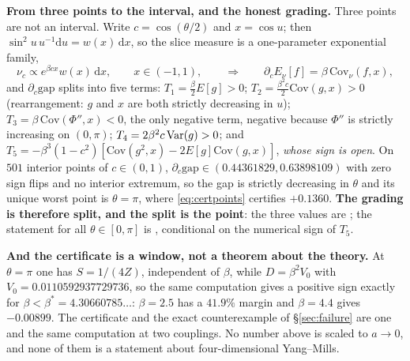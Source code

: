 \noindent
\textbf{From three points to the interval, and the honest grading.} Three points are not an interval.
Write $c=\cos(\theta/2)$ and $x=\cos u$; then $\sin^{2}u\,u^{-1}\mathrm{d}u=w(x)\,\mathrm{d}x$, so the
slice measure is a one-parameter exponential family,
\begin{equation}
\nu_{c}\propto e^{\beta cx}w(x)\,\mathrm{d}x,\qquad x\in(-1,1),
\qquad\Longrightarrow\qquad
\partial_{c}E_{\nu}[f]=\beta\,\mathrm{Cov}_{\nu}(f,x),
\label{eq:expfam}
\end{equation}
and $\partial_{c}\mathrm{gap}$ splits into five terms: $T_{1}=\tfrac{\beta}{2}E[g]>0$;
$T_{2}=\tfrac{\beta^{2}c}{2}\mathrm{Cov}(g,x)>0$ (rearrangement: $g$ and $x$ are both strictly
decreasing in $u$); $T_{3}=\beta\,\mathrm{Cov}(\Phi'',x)<0$, the only negative term, negative because
$\Phi''$ is strictly increasing on $(0,\pi)$; $T_{4}=2\beta^{2}c\operatorname{Var}(g)>0$; and
$T_{5}=-\beta^{3}(1-c^{2})[\mathrm{Cov}(g^{2},x)-2E[g]\mathrm{Cov}(g,x)]$, \emph{whose sign is open}.
On $501$ interior points of $c\in(0,1)$, $\partial_{c}\mathrm{gap}\in(0.44361829,0.63898109)$ with zero
sign flips and no interior extremum, so the gap is strictly decreasing in $\theta$ and its unique worst
point is $\theta=\pi$, where \eqref{eq:certpoints} certifies $+0.1360$. \textbf{The grading is therefore
split, and the split is the point}: the three values are \LT; the statement for all
$\theta\in[0,\pi]$ is \LC, conditional on the numerical sign of $T_{5}$. \LC
{}

\noindent
\textbf{And the certificate is a window, not a theorem about the theory.} At $\theta=\pi$ one has
$S=1/(4Z)$, independent of $\beta$, while $D=\beta^{2}V_{0}$ with $V_{0}=0.0110592937729736$, so the
same computation gives a positive sign exactly for $\beta<\beta^{*}=4.30660785\ldots$: $\beta=2.5$ has
a $41.9\%$ margin and $\beta=4.4$ gives $-0.00899$. The certificate and the exact counterexample of
\S\ref{sec:failure} are one and the same computation at two couplings. No number above is scaled to
$a\to0$, and none of them is a statement about four-dimensional Yang--Mills. \LN
{}

